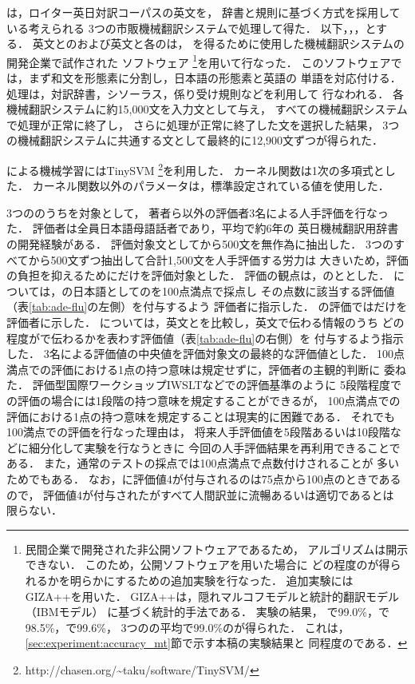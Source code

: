 \documentclass[japanese]{jnlp_1.4}
\newcommand{\align}{}
\newcommand{\ADE}{}
\newcommand{\FLU}{}
\newcommand{\HUM}{}
\newcommand{\MT}{}
\newcommand{\SVM}{}
\newcommand{\ACC}{}
\newcommand{\MTS}{}
\newcommand{\MTF}{}
\newcommand{\MTL}{}
\begin{document}
{\MT}は，ロイター英日対訳コーパスの英文を，
辞書と規則に基づく方式を採用している考えられる
3つの市販機械翻訳システムで処理して得た．
以下，{\MTS}，{\MTF}，{\MTL}とする．
英文と{\HUM}の{\align}および英文と各{\MT}の{\align}は，
{\MTS}を得るために使用した機械翻訳システムの開発企業で試作された
ソフトウェア
\footnote{民間企業で開発された非公開ソフトウェアであるため，
アルゴリズムは開示できない．
このため，公開ソフトウェアを用いた場合に
どの程度の{\ACC}が得られるかを明らかにするための追加実験を行なった．
追加実験にはGIZA++\cite{Och03}を用いた．
GIZA++は，隠れマルコフモデルと統計的翻訳モデル（IBMモデル）
に基づく統計的{\align}手法である．
実験の結果，
{\MTS}で99.0\%，{\MTF}で98.5\%，{\MTL}で99.6\%，
3つの{\MT}の平均で99.0\%の{\ACC}が得られた\cite{Kotani09b}．
これは，\ref{sec:experiment:accuracy_mt}節で示す本稿の実験結果と
同程度の{\ACC}である．
}を用いて行なった．
このソフトウェアでは，まず和文を形態素に分割し，日本語の形態素と英語の
単語を対応付ける．
{\align}処理は，対訳辞書，シソーラス，係り受け規則などを利用して
行なわれる．
各機械翻訳システムに約15,000文を入力文として与え，
すべての機械翻訳システムで処理が正常に終了し，
さらに{\align}処理が正常に終了した文を選択した結果，
3つの機械翻訳システムに共通する文として最終的に12,900文ずつが得られた．

{\SVM}による機械学習にはTinySVM
\footnote{http://chasen.org/{\textasciitilde}taku/software/TinySVM/}を利用した．
カーネル関数は1次の多項式とした．
カーネル関数以外のパラメータは，標準設定されている値を使用した．



3つの{\MT}のうち{\MTS}を対象として，
著者ら以外の評価者3名による人手評価を行なった．
評価者は全員日本語母語話者であり，平均で約6年の
英日機械翻訳用辞書の開発経験がある．
評価対象文として{\MTS}から500文を無作為に抽出した．
3つの{\MT}すべてから500文ずつ抽出して合計1,500文を人手評価する労力は
大きいため，評価の負担を抑えるために{\MTS}だけを評価対象とした．
評価の観点は，{\MT}の{\FLU}と{\ADE}とした．
{\FLU}については，{\MT}の日本語としての{\FLU}を100点満点で採点し
その点数に該当する評価値（表\ref{tab:ade-flu}の左側）を付与するよう
評価者に指示した．
{\FLU}の評価では{\MT}だけを評価者に示した．
{\ADE}については，英文と{\MT}を比較し，英文で伝わる情報のうち
どの程度が{\MT}で伝わるかを表わす評価値（表\ref{tab:ade-flu}の右側）を
付与するよう指示した．
3名による評価値の中央値を評価対象文の最終的な評価値とした．
100点満点での評価における1点の持つ意味は規定せずに，評価者の主観的判断に
委ねた．
評価型国際ワークショップIWSLTなどでの評価基準のように
5段階程度での評価の場合には1段階の持つ意味を規定することができるが，
100点満点での評価における1点の持つ意味を規定することは現実的に困難である．
それでも100満点での評価を行なった理由は，
将来人手評価値を5段階あるいは10段階などに細分化して実験を行なうときに
今回の人手評価結果を再利用できることである．
また，通常のテストの採点では100点満点で点数付けされることが
多いためでもある．
なお，{\MT}に評価値4が付与されるのは75点から100点のときであるので，
評価値4が付与された{\MT}がすべて人間訳並に流暢あるいは適切であるとは
限らない．
\end{document}
